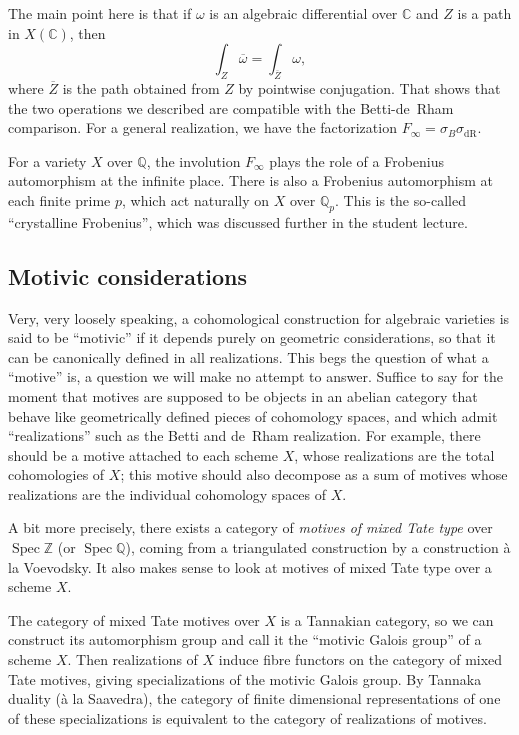 \documentclass[12pt]{article}
\def\CC{\mathbb{C}}
\def\QQ{\mathbb{Q}}
\def\ZZ{\mathbb{Z}}
\DeclareMathOperator{\dR}{dR}
\DeclareMathOperator{\Spec}{Spec}
\begin{document}
The main point here is that if $\omega$ is an algebraic differential
over $\CC$ and $Z$ is a path in $X(\CC)$, then
\[
\int_Z \overline{\omega} = \int_{\overline{Z}} \omega,
\]
where $\overline{Z}$ is the path obtained from $Z$ by pointwise conjugation.
That shows that the two operations we described are compatible with
the Betti-de~Rham comparison.
For a general realization, we have the factorization
$F_{\infty} = \sigma_B \sigma_{\dR}$.

For a variety $X$ over $\QQ$, the involution $F_\infty$ plays the role
of a Frobenius automorphism at the infinite place. There is also a
Frobenius automorphism at each finite prime $p$, which act naturally on
$X$ over $\QQ_p$. This is the so-called ``crystalline Frobenius'', which
was discussed further in the student lecture.

\subsection{Motivic considerations}

Very, very loosely speaking,
a cohomological construction for algebraic varieties is said to be
``motivic'' if it depends purely on geometric considerations,
so that it can be canonically defined in all realizations. This begs
the question of what a ``motive'' is, a question we will make no attempt
to answer. Suffice to say for the moment that motives are supposed to be
objects in an abelian category that behave like geometrically defined
pieces of cohomology spaces, and which admit ``realizations'' such as the
Betti and de~Rham realization. For example, there should be a motive attached
to each scheme $X$, whose realizations are the total cohomologies of $X$;
this motive should also decompose as a sum of motives whose realizations
are the individual cohomology spaces of $X$.

A bit more precisely, there exists
a category of \emph{motives of mixed Tate type} over $\Spec \ZZ$
(or $\Spec \QQ$), coming from a triangulated construction by a construction
\`a la Voevodsky. It also makes sense to look at motives of mixed
Tate type over a scheme $X$.

The category of mixed Tate motives over $X$ is a Tannakian category,
so we can construct its automorphism group and call it the
``motivic Galois group'' of a scheme $X$. Then realizations of $X$
induce fibre functors on the category of mixed Tate motives,
giving specializations of the motivic Galois group. By Tannaka duality
(\`a la Saavedra),
the category of finite dimensional representations of one of
these specializations is equivalent to the category of realizations
of motives.
\end{document}
